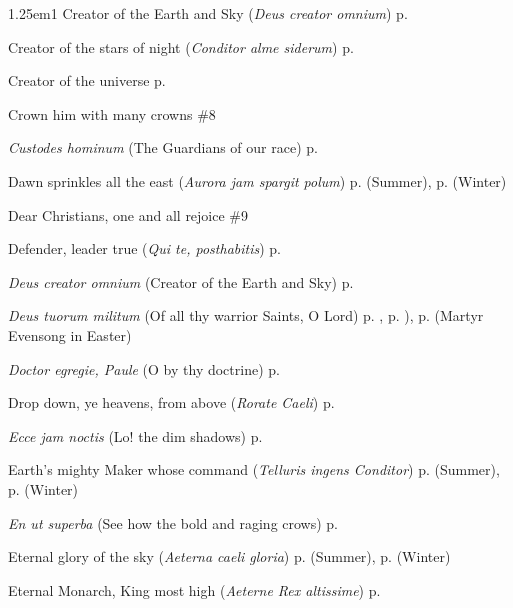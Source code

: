 \begin{hangparas}{1.25em}{1}
Creator of the Earth and Sky (\textit{Deus creator omnium}) \dotfill p. \pageref{WeekdayInvitatory}
\par\noindent
Creator of the stars of night (\textit{Conditor alme siderum}) \dotfill p. \pageref{FirstAdventEvensong}
\par\noindent
Creator of the universe \dotfill p. \pageref{EliasInvitatory}
\par\noindent
Crown him with many crowns \dotfill \#8
\par\noindent
\textit{Custodes hominum} (The Guardians of our race) \dotfill p. \pageref{GuardianAngelsEvensong}
\par\noindent
Dawn sprinkles all the east (\textit{Aurora jam spargit polum}) \dotfill p. \pageref{SaturdayMattinsSummer} (Summer), p. \pageref{SaturdayMattinsWinter} (Winter)
\par\noindent
Dear Christians, one and all rejoice \dotfill \#9
\par\noindent
Defender, leader true (\textit{Qui te, posthabitis}) \dotfill p. \pageref{MaurusEvensong}
\par\noindent
\textit{Deus creator omnium} (Creator of the Earth and Sky) \dotfill p. \pageref{WeekdayInvitatory}
\par\noindent
\textit{Deus tuorum militum} (Of all thy warrior Saints, O Lord) \dotfill p. \pageref{StephenEvensong}, p. \pageref{MartyrEvensong}), p. \pageref{MartyrsEvensongEaster} (Martyr Evensong in Easter)
\par\noindent
\textit{Doctor egregie, Paule} (O by thy doctrine) \dotfill p. \pageref{PaulEvensong}
\par\noindent
Drop down, ye heavens, from above (\textit{Rorate Caeli}) \dotfill p. \pageref{AdventProse}
\par\noindent
\textit{Ecce jam noctis} (Lo! the dim shadows) \dotfill p. \pageref{SundayMattinsSummer}
\par\noindent
Earth's mighty Maker whose command (\textit{Telluris ingens Conditor}) \dotfill p. \pageref{TuesdayEvensongSummer} (Summer), p. \pageref{TuesdayEvensongWinter} (Winter)
\par\noindent
\textit{En ut superba} (See how the bold and raging crows) \dotfill p. \pageref{CompassionInvitatory}
\par\noindent
Eternal glory of the sky (\textit{Aeterna caeli gloria}) \dotfill p. \pageref{FridayMattinsSummer} (Summer), p. \pageref{FridayMattinsWinter} (Winter)
\par\noindent
Eternal Monarch, King most high (\textit{Aeterne Rex altissime}) \dotfill p. \pageref{AscensionInvitatoryHymn}

\end{hangparas}
